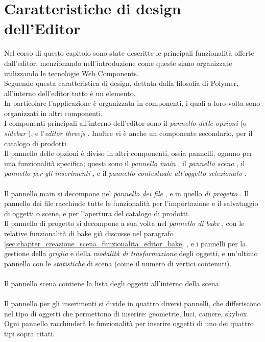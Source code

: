 \section{Caratteristiche di design dell’Editor}
\label{sec:chapter_creazione_scena_design}
Nel corso di questo capitolo sono state descritte le principali funzionalità offerte dall’editor, menzionando nell’introduzione come queste siano organizzate utilizzando le tecnologie Web Components.
\\
Seguendo questa caratteristica di design, dettata dalla filosofia di Polymer, all’interno dell’editor tutto è un elemento.
\\
In particolare l’applicazione è organizzata in componenti, i quali a loro volta sono organizzati in altri componenti.
\\
I componenti principali all'interno dell'editor sono il \emph{pannello delle opzioni} (o \emph{sidebar} ), e l’\emph{editor threejs} . Inoltre vi è anche un componente secondario, per il catalogo di prodotti.
\\
Il pannello delle opzioni è diviso in altri componenti, ossia pannelli, ognuno per una funzionalità specifica; questi sono il \emph{pannello main} , il \emph{pannello scena} , il \emph{pannello per gli inserimenti} , e il \emph{pannello contestuale all’oggetto selezionato} .
\\
\\
Il pannello main si decompone nel \emph{pannello dei file} , e in quello \emph{di progetto} . 
Il pannello dei file racchiude tutte le funzionalità per l’importazione e il salvataggio di oggetti o scene, e per l’apertura del catalogo di prodotti.
\\
Il pannello di progetto si decompone a sua volta nel \emph{pannello di bake} , con le relative funzionalità di bake già discusse nel paragrafo \ref{sec:chapter_creazione_scena_funzionalita_editor_bake} , e i pannelli per la gestione della \emph{griglia} e della \emph{modalità di trasformazione} degli oggetti, e un’ultimo pannello con le \emph{statistiche} di scena (come il numero di vertici contenuti).
\\
\\
Il pannello scena contiene la lista degli oggetti all’interno della scena. 
\\
\\
Il pannello per gli inserimenti si divide in quattro diversi pannelli, che differiscono nel tipo di oggetti che permettono di inserire: geometrie, luci, camere, skybox. Ogni pannello racchiuderà le funzionalità per inserire oggetti di uno dei quattro tipi sopra citati.
